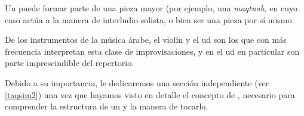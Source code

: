         Un \taqsim puede formar parte de una pieza mayor (por ejemplo, una \emph{maqtuah}, en cuyo caso actúa a la manera de interludio solista, o bien ser una pieza por sí mismo.

        De los instrumentos de la música árabe, el violín y el ud son los que con más frecuencia interpretan esta clase de improvisaciones, y en el ud en particular son parte imprescindible del repertorio.

        Debido a su importancia, le dedicaremos una sección independiente (ver \ref{taqsim2}) una vez que hayamos visto en detalle el concepto de \maqam, necesario para comprender la estructura de un \taqsim y la manera de tocarlo.





